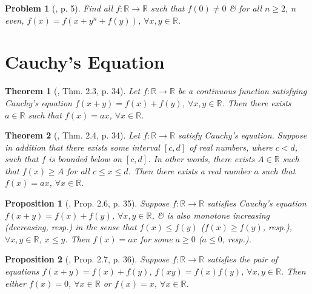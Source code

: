 \documentclass{article}
\newtheorem{problem}{Problem}
\newtheorem{proposition}{Proposition}
\newtheorem{theorem}{Theorem}
\begin{document}
\begin{problem}[\cite{Dung_cac_phuong_phap_giai_toan_qua_cac_ky_thi_olympic_2022}, p. 5]
	Find all $f:\mathbb{R}\to\mathbb{R}$ such that $f(0)\ne0$ \& for all $n\ge2$, $n$ even, $f(x) = f(x + y^n + f(y))$, $\forall x,y\in\mathbb{R}$.
\end{problem}


\section{Cauchy's Equation}

\begin{theorem}[\cite{Small2007}, Thm. 2.3, p. 34]
	Let $f:\mathbb{R}\to\mathbb{R}$ be a continuous function satisfying Cauchy's equation $f(x + y) = f(x) + f(y)$, $\forall x,y\in\mathbb{R}$. Then there exists $a\in\mathbb{R}$ such that $f(x) = ax$, $\forall x\in\mathbb{R}$.
\end{theorem}

\begin{theorem}[\cite{Small2007}, Thm. 2.4, p. 34]
	Let $f:\mathbb{R}\to\mathbb{R}$ satisfy Cauchy's equation. Suppose in addition that there exists some interval $[c,d]$ of real numbers, where $c < d$, such that $f$ is bounded below on $[c,d]$. In other words, there exists $A\in\mathbb{R}$ such that $f(x)\ge A$ for all $c\le x\le d$. Then there exists a real number $a$ such that $f(x) = ax$, $\forall x\in\mathbb{R}$.
\end{theorem}

\begin{proposition}[\cite{Small2007}, Prop. 2.6, p. 35]
	Suppose $f:\mathbb{R}\to\mathbb{R}$ satisfies Cauchy's equation $f(x + y) = f(x) + f(y)$, $\forall x,y\in\mathbb{R}$, \& is also monotone increasing (decreasing, resp.) in the sense that $f(x)\le f(y)$ ($f(x)\ge f(y)$, resp.), $\forall x,y\in\mathbb{R}$, $x\le y$. Then $f(x) = ax$ for some $a\ge0$ ($a\le0$, resp.).
\end{proposition}

\begin{proposition}[\cite{Small2007}, Prop. 2.7, p. 36]
	Suppose $f:\mathbb{R}\to\mathbb{R}$ satisfies the pair of equations $f(x + y) = f(x) + f(y)$, $f(xy) = f(x)f(y)$, $\forall x,y\in\mathbb{R}$. Then either $f(x) = 0$, $\forall x\in\mathbb{R}$ or $f(x) = x$, $\forall x\in\mathbb{R}$.
\end{proposition}


\printbibliography[heading=bibintoc]
	
\end{document}
